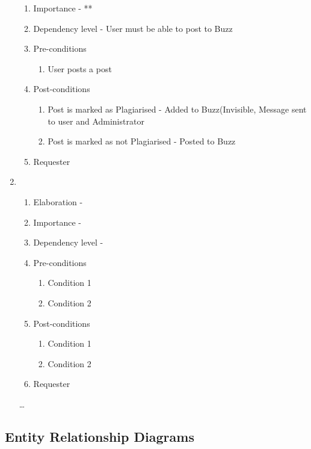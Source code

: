 \documentclass[12pt]{article}
\begin{document}
\begin{enumerate}
\begin{enumerate}
    \item Importance - **
    \item Dependency level - User must be able to post to Buzz
    \item Pre-conditions
    \begin{enumerate}
    	\item User posts a post
    \end{enumerate}
        \item Post-conditions
    \begin{enumerate}
    	\item Post is marked as Plagiarised - Added to Buzz(Invisible, Message sent to user and Administrator
    	\item Post is marked as not Plagiarised - Posted to Buzz
    \end{enumerate}
    \item Requester
  \end{enumerate}
\newpage %
   \item  %
  \begin{enumerate}
    \item Elaboration - 
    \item Importance - 
    \item Dependency level - 
    \item Pre-conditions
    \begin{enumerate}
    	\item Condition 1
    	\item Condition 2
    \end{enumerate}
        \item Post-conditions
    \begin{enumerate}
    	\item Condition 1
    	\item Condition 2
    \end{enumerate}
    \item Requester
  \end{enumerate}
  \ldots
\end{enumerate}




\newpage

\subsection{Entity Relationship Diagrams}
\end{document}
